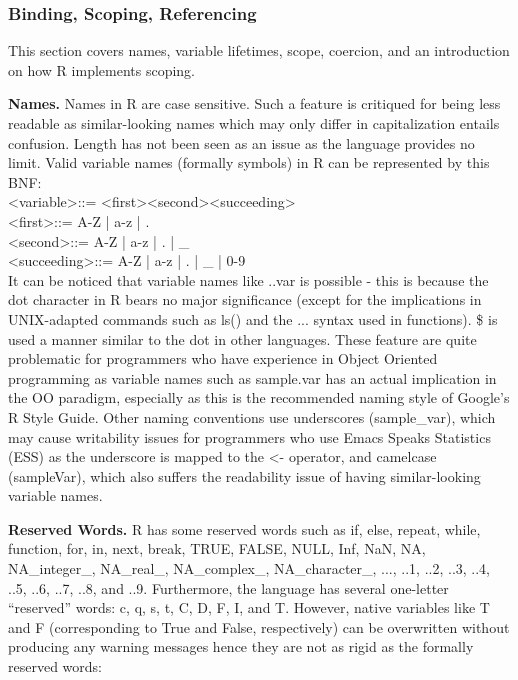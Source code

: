 \documentclass[12pt]{article}
\begin{document}
\subsubsection{Binding, Scoping, Referencing}

This section covers names, variable lifetimes, scope, coercion, and an introduction on how R implements scoping.

\textbf{Names.} Names in R are case sensitive. Such a feature is critiqued for being less readable as similar-looking names which may only differ in capitalization entails confusion. Length has not been seen as an issue as the language provides no limit. Valid variable names (formally symbols) in R can be represented by this BNF: \\
\textless variable\textgreater ::= \textless first\textgreater \textless second\textgreater \textless succeeding\textgreater* \\
\textless first\textgreater ::= A-Z | a-z | . \\
\textless second\textgreater ::= A-Z | a-z | . | \_ \\
\textless succeeding\textgreater ::= A-Z | a-z | . | \_ | 0-9 \\

It can be noticed that variable names like ..var is possible - this is because the dot character in R bears no major significance (except for the implications in UNIX-adapted commands such as ls() and the ... syntax used in functions). \$ is used a manner similar to the dot in other languages. These feature are quite problematic for programmers who have experience in Object Oriented programming as variable names such as sample.var has an actual implication in the OO paradigm, especially as this is the recommended naming style of Google's R Style Guide. Other naming conventions use underscores (sample\_var), which may cause writability issues for programmers who use Emacs Speaks Statistics (ESS) as the underscore is mapped to the <- operator, and camelcase (sampleVar), which also suffers the readability issue of having similar-looking variable names.


\textbf{Reserved Words.} R has some reserved words such as if, else, repeat, while, function, for, in, next, break, TRUE, FALSE, NULL, Inf, NaN, NA, NA\_integer\_, NA\_real\_, NA\_complex\_, NA\_character\_, ..., ..1, ..2, ..3, ..4, ..5, ..6, ..7, ..8, and ..9. Furthermore, the language has several one-letter ``reserved'' words: c, q, s, t, C, D, F, I, and T. However, native variables like T and F (corresponding to True and False, respectively) can be overwritten without producing any warning messages hence they are not as rigid as the formally reserved words:
\end{document}
